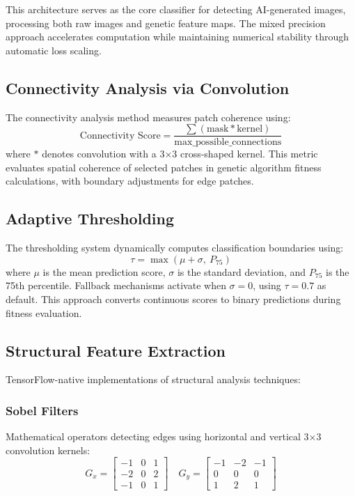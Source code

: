 \documentclass[runningheads]{llncs}
\begin{document}
This architecture serves as the core classifier for detecting AI-generated images, processing both raw images and genetic feature maps. The mixed precision approach accelerates computation while maintaining numerical stability through automatic loss scaling.

\subsection{Connectivity Analysis via Convolution}
The connectivity analysis method measures patch coherence using:
\begin{equation}
\text{Connectivity Score} = \frac{\sum (\text{mask} \ast \text{kernel})}{\text{max\_possible\_connections}}
\end{equation}
where $\ast$ denotes convolution with a 3×3 cross-shaped kernel. This metric evaluates spatial coherence of selected patches in genetic algorithm fitness calculations, with boundary adjustments for edge patches.

\subsection{Adaptive Thresholding}
The thresholding system dynamically computes classification boundaries using:
\begin{equation}
\tau = \max\left(\mu + \sigma, \: P_{75}\right)
\end{equation}
where $\mu$ is the mean prediction score, $\sigma$ is the standard deviation, and $P_{75}$ is the 75th percentile. Fallback mechanisms activate when $\sigma = 0$, using $\tau = 0.7$ as default. This approach converts continuous scores to binary predictions during fitness evaluation.

\subsection{Structural Feature Extraction}
TensorFlow-native implementations of structural analysis techniques:

\subsubsection{Sobel Filters}
Mathematical operators detecting edges using horizontal and vertical 3×3 convolution kernels:
\[
G_x = \begin{bmatrix} -1 & 0 & 1 \\ -2 & 0 & 2 \\ -1 & 0 & 1 \end{bmatrix} \quad
G_y = \begin{bmatrix} -1 & -2 & -1 \\ 0 & 0 & 0 \\ 1 & 2 & 1 \end{bmatrix}
\]
\end{document}

